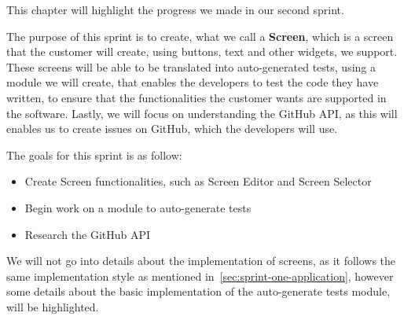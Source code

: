 This chapter will highlight the progress we made in our second sprint.

The purpose of this sprint is to create, what we call a \textbf{Screen}, which is a screen that the customer will create, using buttons, text and other widgets, we support.
These screens will be able to be translated into auto-generated tests, using a module we will create, that enables the developers to test the code they have written, to ensure that the functionalities the customer wants are supported in the software.
Lastly, we will focus on understanding the GitHub API, as this will enables us to create issues on GitHub, which the developers will use.

The goals for this sprint is as follow:

\begin{itemize}
    \item Create Screen functionalities, such as Screen Editor and Screen Selector
    \item Begin work on a module to auto-generate tests
    \item Research the GitHub API
\end{itemize}

We will not go into details about the implementation of screens, as it follows the same implementation style as mentioned in~\autoref{sec:sprint-one-application}, however some details about the basic implementation of the auto-generate tests module, will be highlighted.
